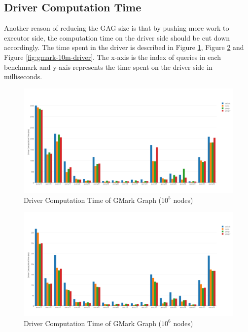 \subsection{Driver Computation Time}
Another reason of reducing the GAG size is that by pushing more work to executor side, the computation time on the driver side should be cut down accordingly. The time spent in the driver is described in Figure \ref{fig:gmark-01m-driver}, Figure \ref{fig:gmark-1m-driver} and Figure \ref{fig:gmark-10m-driver}. The x-axis is the index of queries in each benchmark and y-axis represents the time spent on the driver side in milliseconds.
\begin{figure}[h!]
  \caption{Driver Computation Time of GMark Graph ($10^5$ nodes)}
  \label{fig:gmark-01m-driver}
  \centering
    \includegraphics[width=1.0\textwidth]{img/gmark-01m-driver}
\end{figure}
\begin{figure}[h!]
  \caption{Driver Computation Time of GMark Graph ($10^6$ nodes)}
  \label{fig:gmark-1m-driver}
  \centering
    \includegraphics[width=1.0\textwidth]{img/gmark-1m-driver}
\end{figure}
